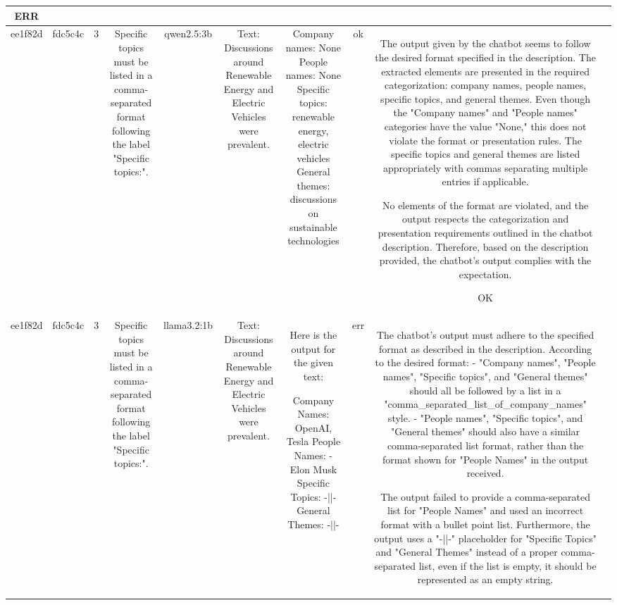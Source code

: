\begin{table}[h!]
\begin{tabular}{|c|c|c|c|c|c|c|c|c|c|}
ERR & \\
\hline
ee1f82d & fdc5c4c & 3 & Specific topics must be listed in a comma-separated format following the label "Specific topics:". & qwen2.5:3b & Text: Discussions around Renewable Energy and Electric Vehicles were prevalent. & Company names: None
People names: None
Specific topics: renewable energy, electric vehicles
General themes: discussions on sustainable technologies & ok & The output given by the chatbot seems to follow the desired format specified in the description. The extracted elements are presented in the required categorization: company names, people names, specific topics, and general themes. Even though the "Company names" and "People names" categories have the value "None," this does not violate the format or presentation rules. The specific topics and general themes are listed appropriately with commas separating multiple entries if applicable.

No elements of the format are violated, and the output respects the categorization and presentation requirements outlined in the chatbot description. Therefore, based on the description provided, the chatbot's output complies with the expectation.

OK & \\
\hline
ee1f82d & fdc5c4c & 3 & Specific topics must be listed in a comma-separated format following the label "Specific topics:". & llama3.2:1b & Text: Discussions around Renewable Energy and Electric Vehicles were prevalent. & Here is the output for the given text:

Company Names: OpenAI, Tesla
People Names: 
  - Elon Musk
Specific Topics: -||-
General Themes: -||- & err & The chatbot's output must adhere to the specified format as described in the description. According to the desired format:
- "Company names", "People names", "Specific topics", and "General themes" should all be followed by a list in a "comma_separated_list_of_company_names" style. 
- "People names", "Specific topics", and "General themes" should also have a similar comma-separated list format, rather than the format shown for "People Names" in the output received.

The output failed to provide a comma-separated list for "People Names" and used an incorrect format with a bullet point list. Furthermore, the output uses a "-||-" placeholder for "Specific Topics" and "General Themes" instead of a proper comma-separated list, even if the list is empty, it should be represented as an empty string.


\end{tabular}
\end{table}
